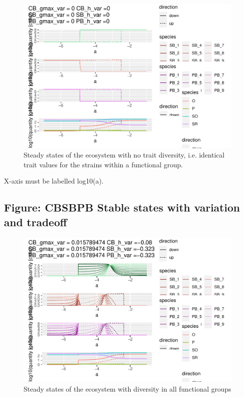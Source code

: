 \documentclass{article}
\begin{document}
\begin{figure}

{\centering \includegraphics[width=1\linewidth]{article_files/figure-latex/ss_novar-1} 

}

\caption{Steady states of the ecosystem with no trait diversity, i.e. identical trait values for the strains within a functional group.}\label{fig:ss_novar}
\end{figure}

X-axis must be labelled log10(a).

\hypertarget{figure-cbsbpb-stable-states-with-variation-and-tradeoff}{%
\subsection{Figure: CBSBPB Stable states with variation and
tradeoff}\label{figure-cbsbpb-stable-states-with-variation-and-tradeoff}}

\begin{figure}

{\centering \includegraphics[width=1\linewidth]{article_files/figure-latex/ss_var-1} 

}

\caption{Steady states of the ecosystem with diversity in all functional groups}\label{fig:ss_var}
\end{figure}
\end{document}
